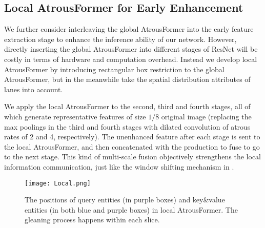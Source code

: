 \documentclass[preprint,12pt,review]{elsarticle}
\begin{document}
\subsection{Local AtrousFormer for Early Enhancement}
We further consider interleaving the global AtrousFormer into the early feature extraction stage to enhance the inference ability of our network. However, directly inserting the global AtrousFormer into different stages of ResNet will be costly in terms of hardware and computation overhead. Instead we develop local AtrousFormer by introducing rectangular box restriction to the global AtrousFormer, but in the meanwhile take the spatial distribution attributes of lanes into account. 

We apply the local AtrousFormer to the second, third and fourth stages, all of which generate representative features of size $1/8$ original image (replacing the max poolings in the third and fourth stages with dilated convolution of atrous rates of 2 and 4, respectively). The unenhanced feature after each stage is sent to the local AtrousFormer, and then concatenated with the production to fuse to go to the next stage. This kind of multi-scale fusion objectively strengthens the local information communication, just like the window shifting mechanism in \cite{swin}. 

\begin{figure}[tbp]
	\centering
	\texttt{[image: Local.png]}
	\caption{The positions of query entities (in purple boxes) and key\&value entities (in both blue and purple boxes) in local AtrousFormer. The gleaning process happens within each slice.}
	\label{fig:att1}
\end{figure}
\end{document}

